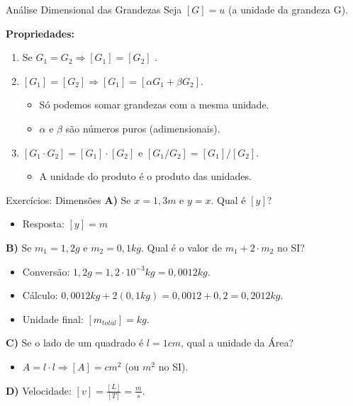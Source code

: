 \documentclass{beamer}
\begin{document}
	\begin{frame}{Análise Dimensional das Grandezas}
		Seja $[G] = u$ (a unidade da grandeza G).
		
		\textbf{Propriedades:}
		\begin{enumerate}
			\item Se $G_1 = G_2 \Rightarrow [G_1] = [G_2]$ .
			
			\item $[G_1] = [G_2] \Rightarrow [G_1] = [\alpha G_1 + \beta G_2]$.
			\begin{itemize}
				\item Só podemos somar grandezas com a mesma unidade.
				\item $\alpha$ e $\beta$ são números puros (adimensionais).
			\end{itemize}
			
			\item $[G_1 \cdot G_2] = [G_1] \cdot [G_2]$ e $[G_1 / G_2] = [G_1] / [G_2]$.
			\begin{itemize}
				\item A unidade do produto é o produto das unidades.
			\end{itemize}
		\end{enumerate}
	\end{frame}
	
	\begin{frame}{Exercícios: Dimensões}
		\textbf{A)} Se $x = 1,3 m$ e $y=x$. Qual é $[y]$?
		\begin{itemize}
			\item Resposta: $[y] = m$
		\end{itemize}
		
		\vspace{0.3cm}
		\textbf{B)} Se $m_1 = 1,2 g$ e $m_2 = 0,1 kg$. Qual é o valor de $m_1 + 2 \cdot m_2$ no SI?
		\begin{itemize}
			\item Conversão: $1,2 g = 1,2 \cdot 10^{-3} kg = 0,0012 kg$.
			\item Cálculo: $0,0012 kg + 2(0,1 kg) = 0,0012 + 0,2 = 0,2012 kg$.
			\item Unidade final: $[m_{total}] = kg$.
		\end{itemize}
		
		\vspace{0.3cm}
		\textbf{C)} Se o lado de um quadrado é $l = 1 cm$, qual a unidade da Área?
		\begin{itemize}
			\item $A = l \cdot l \Rightarrow [A] = cm^2$ (ou $m^2$ no SI).
		\end{itemize}
		
		\vspace{0.3cm}
		\textbf{D)} Velocidade: $[v] = \frac{[L]}{[T]} = \frac{m}{s}$.
	\end{frame}
	
\end{document}
